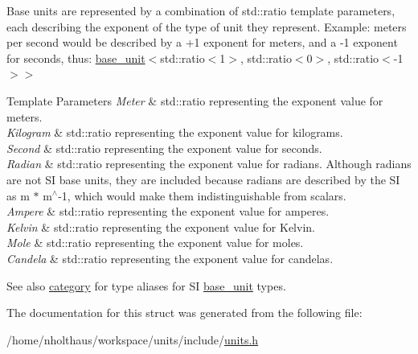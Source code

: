 Base units are represented by a combination of {\ttfamily std\+::ratio} template parameters, each describing the exponent of the type of unit they represent. Example\+: meters per second would be described by a +1 exponent for meters, and a -\/1 exponent for seconds, thus\+: {\ttfamily \hyperlink{structunits_1_1base__unit}{base\+\_\+unit}$<$std\+::ratio$<$1$>$, std\+::ratio$<$0$>$, std\+::ratio$<$-\/1$>$$>$} 
\begin{DoxyTemplParams}{Template Parameters}
{\em Meter} & {\ttfamily std\+::ratio} representing the exponent value for meters. \\
\hline
{\em Kilogram} & {\ttfamily std\+::ratio} representing the exponent value for kilograms. \\
\hline
{\em Second} & {\ttfamily std\+::ratio} representing the exponent value for seconds. \\
\hline
{\em Radian} & {\ttfamily std\+::ratio} representing the exponent value for radians. Although radians are not S\+I base units, they are included because radians are described by the S\+I as m $\ast$ m$^\wedge$-\/1, which would make them indistinguishable from scalars. \\
\hline
{\em Ampere} & {\ttfamily std\+::ratio} representing the exponent value for amperes. \\
\hline
{\em Kelvin} & {\ttfamily std\+::ratio} representing the exponent value for Kelvin. \\
\hline
{\em Mole} & {\ttfamily std\+::ratio} representing the exponent value for moles. \\
\hline
{\em Candela} & {\ttfamily std\+::ratio} representing the exponent value for candelas. \\
\hline
\end{DoxyTemplParams}
\begin{DoxySeeAlso}{See also}
\hyperlink{namespaceunits_1_1category}{category} for type aliases for S\+I \hyperlink{structunits_1_1base__unit}{base\+\_\+unit} types. 
\end{DoxySeeAlso}


The documentation for this struct was generated from the following file\+:\begin{DoxyCompactItemize}
\item 
/home/nholthaus/workspace/units/include/\hyperlink{units_8h}{units.\+h}\end{DoxyCompactItemize}
